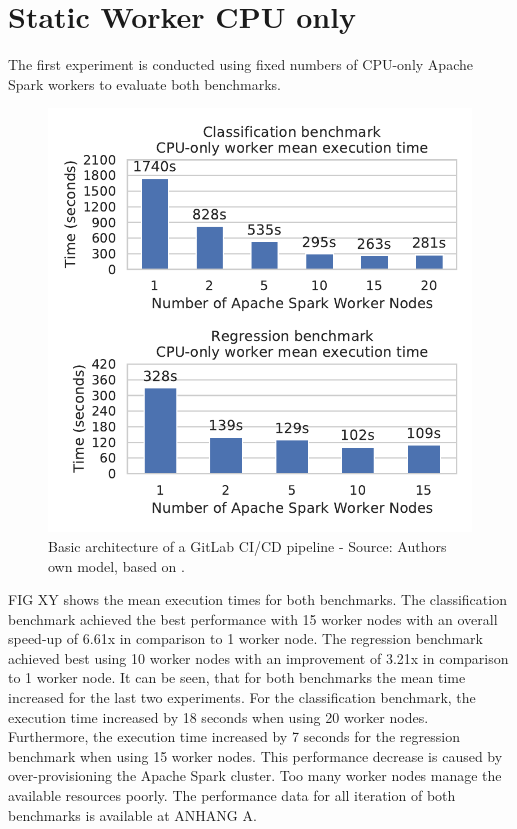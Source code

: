 \section{Static Worker CPU only}
The first experiment is conducted using fixed numbers of CPU-only Apache Spark workers to evaluate both benchmarks.
\begin{figure}[h]
\centering
\includegraphics[scale=1]{images/07_evaluation/overall_cpu}
\caption{Basic architecture of a GitLab CI/CD pipeline - Source: Authors own model, based on \cite{Gitlab2020Docs}.}
\label{fig:07_mortgage_static-cpu_results}
\end{figure}
FIG XY shows the mean execution times for both benchmarks.
The classification benchmark achieved the best performance with 15 worker nodes with an overall speed-up of 6.61x in comparison to 1 worker node. The regression benchmark achieved best using 10 worker nodes with an improvement of 3.21x in comparison to 1 worker node.
It can be seen, that for both benchmarks the mean time increased for the last two experiments. For the classification benchmark, the execution time increased by 18 seconds when using 20 worker nodes. Furthermore, the execution time increased by 7 seconds for the regression benchmark when using 15 worker nodes.
This performance decrease is caused by over-provisioning the Apache Spark cluster. Too many worker nodes manage the available resources poorly.
The performance data for all iteration of both benchmarks is available at ANHANG A.


